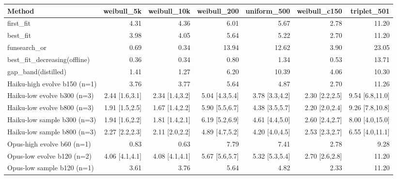 \begin{tabular}{lrrrrrr}
\toprule
Method & weibull\_5k & weibull\_10k & weibull\_200 & uniform\_500 & weibull\_c150 & triplet\_501 \\
\midrule
first\_fit & 4.31 & 4.36 & 6.01 & 5.67 & 2.78 & 11.20 \\
best\_fit & 3.98 & 4.05 & 5.64 & 5.22 & 2.70 & 11.20 \\
funsearch\_or & 0.69 & 0.34 & 13.94 & 12.62 & 3.90 & 23.05 \\
best\_fit\_decreasing(offline) & 0.36 & 0.34 & 0.80 & 1.34 & 0.53 & 13.71 \\
gap\_band(distilled) & 1.41 & 1.27 & 6.20 & 10.39 & 4.06 & 10.30 \\
Haiku-high evolve b150 (n=1) & 3.76 & 3.77 & 5.64 & 4.87 & 2.70 & 11.26 \\
Haiku-low evolve b300 (n=3) & 2.44 \scriptsize[1.6,3.1] & 2.34 \scriptsize[1.4,3.2] & 5.04 \scriptsize[4.3,5.4] & 3.78 \scriptsize[3.3,4.2] & 2.30 \scriptsize[2.2,2.5] & 9.54 \scriptsize[6.8,11.0] \\
Haiku-low evolve b800 (n=3) & 1.91 \scriptsize[1.5,2.5] & 1.67 \scriptsize[1.4,2.2] & 5.90 \scriptsize[5.5,6.7] & 4.38 \scriptsize[3.5,5.7] & 2.20 \scriptsize[2.0,2.4] & 9.26 \scriptsize[7.8,10.8] \\
Haiku-low sample b300 (n=3) & 1.94 \scriptsize[1.6,2.2] & 1.81 \scriptsize[1.4,2.1] & 6.19 \scriptsize[5.2,6.9] & 4.61 \scriptsize[4.4,5.0] & 2.60 \scriptsize[2.4,2.7] & 8.00 \scriptsize[4.0,15.0] \\
Haiku-low sample b800 (n=3) & 2.27 \scriptsize[2.2,2.3] & 2.11 \scriptsize[2.0,2.2] & 4.89 \scriptsize[4.7,5.2] & 4.20 \scriptsize[4.0,4.5] & 2.53 \scriptsize[2.3,2.7] & 6.55 \scriptsize[4.0,11.1] \\
Opus-high evolve b60 (n=1) & 0.83 & 0.63 & 7.79 & 7.41 & 2.78 & 9.28 \\
Opus-low evolve b120 (n=2) & 4.06 \scriptsize[4.1,4.1] & 4.08 \scriptsize[4.1,4.1] & 5.67 \scriptsize[5.6,5.7] & 5.32 \scriptsize[5.3,5.4] & 2.70 \scriptsize[2.6,2.8] & 11.20 \\
Opus-low sample b120 (n=1) & 3.61 & 3.76 & 5.64 & 4.82 & 2.33 & 11.20 \\
\bottomrule
\end{tabular}